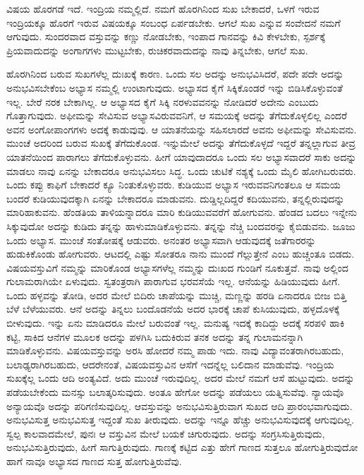 ವಿಷಯ ಹೊರಗಡೆ ಇದೆ. ಇಂದ್ರಿಯ ನಮ್ಮಲ್ಲಿದೆ. ನಮಗೆ ಹೊರಗಿನಿಂದ ಸುಖ ಬೇಕಾದರೆ, ಒಳಗೆ ಇರುವ ಇಂದ್ರಿಯಕ್ಕೂ ಹೊರಗೆ ಇರುವ ವಿಷಯಕ್ಕೂ ಸಂಬಂಧ ಏರ್ಪಡಬೇಕು. ಆಗಲೆ ಸುಖ ಎನ್ನುವ ಸಂವೇದನೆ ನಮಗೆ ಆಗುವುದು. ಸುಂದರವಾದ ವಸ್ತುವನ್ನು ಕಣ್ಣು ನೋಡಬೇಕು, ಇಂಪಾದ ಗಾನವನ್ನು ಕಿವಿ ಕೇಳಬೇಕು, ಸ್ಪರ್ಶಕ್ಕೆ ಪ್ರಿಯವಾದುದನ್ನು ಅಂಗಾಗಗಳು ಮುಟ್ಟಬೇಕು, ರುಚಿಕರವಾದುದನ್ನು ನಾವು ತಿನ್ನಬೇಕು, ಆಗಲೆ ಸುಖ.

ಹೊರಗಿನಿಂದ ಬರುವ ಸುಖಗಳೆಲ್ಲ ದುಃಖಕ್ಕೆ ಕಾರಣ. ಒಂದು ಸಲ ಅದನ್ನು ಅನುಭವಿಸಿದರೆ, ಪದೇ ಪದೇ ಅದನ್ನು ಅನುಭವಿಸಬೇಕೆಂಬ ಅಭ್ಯಾಸ ನಮ್ಮಲ್ಲಿ ಉಂಟಾಗುವುದು. ಅಭ್ಯಾಸದ ಕೈಗೆ ಸಿಕ್ಕಿಕೊಂಡರೆ ಇನ್ನು ಬಿಡಿಸಿಕೊಳ್ಳುವಂತೆ ಇಲ್ಲ. ಬೇರೆ ನರಕ ಬೇಕಾಗಿಲ್ಲ. ಆ ಅಭ್ಯಾಸದ ಕೈಗೆ ಸಿಕ್ಕಿ ನರಳುವವನನ್ನು ನೋಡಿದರೆ ಅದೇನು ಎಂಬುದು ಗೊತ್ತಾಗುವುದು. ಅಫೀಮನ್ನು ಸೇವಿಸುವ ಅಭ್ಯಾಸವಿರುವವನಿಗೆ, ಆ ಸಮಯಕ್ಕೆ ಅದನ್ನು ತೆಗೆದುಕೊಳ್ಳಲಿಲ್ಲ ಎಂದರೆ ಅವನ ಅಂಗೋಪಾಂಗಗಳು ಅದಕ್ಕೆ ಕಾಡುವುವು. ಆ ಯಾತನೆಯನ್ನು ಸಹಿಸಲಾರದೆ ಅವನು ಅಫೀಮನ್ನು ಸೇವಿಸುವನು. ಮುಂಚೆ ಅದರಿಂದ ಬರುವ ಸುಖಕ್ಕೆ ತೆಗೆದುಕೊಂಡ. ಇನ್ನುಮೇಲೆ ಅದನ್ನು ತೆಗೆದುಕೊಳ್ಳದೆ ಇದ್ದರೆ ತನ್ನಲ್ಲಾಗುವ ತೀವ್ರ ಯಾತನೆಯಿಂದ ಪಾರಾಗಲು ತೆಗೆದುಕೊಳ್ಳುವನು. ಹೀಗೆ ಯಾವುದಾದರೂ ಒಂದು ಸಲ ಅಭ್ಯಾಸವಾದರೆ ಸಾಕು ಅದನ್ನು ಮಾಡಲು ನಾವು ಏನನ್ನು ಬೇಕಾದರೂ ಅನುಭವಿಸಲು ಸಿದ್ಧ. ಒಂದು ಚುಟಿಕೆ ನಶ್ಯಕ್ಕೆ ಒಂದು ಮೈಲಿ ಹೋಗಿಬರುವರು. ಒಂದು ಕಪ್ಪು ಕಾಫಿಗೆ ಬೇಕಾದರೆ ಕ್ಯೂ ನಿಂತುಕೊಳ್ಳುವರು. ಕುಡಿಯುವ ಅಭ್ಯಾಸ ಇರುವವನಿಗಂತಲೂ ಆ ಸಮಯ ಬಂದರೆ ಕುಡಿಯುವುದಕ್ಕಾಗಿ ಏನನ್ನು ಬೇಕಾದರೂ ಮಾಡುವನು. ದುಡ್ಡಿಲ್ಲದಿದ್ದರೆ ಕದಿಯುವನು, ತನ್ನಲ್ಲಿರುವುದನ್ನು ಮಾರಿಹಾಕುವನು. ಹೆಂಡತಿಯ ತಾಳಿ\-ಯನ್ನಾ\-ದರೂ ಮಾರಿ ಕುಡಿಯುವವರೆಗೆ ಹೋಗುವನು. ಹೆಂಡದ ಬದಲು ಇನ್ನೇನು ಸಿಕ್ಕುವುದೋ ಅದನ್ನು ಕುಡಿದು ತನ್ನನ್ನು ಹಾಳುಮಾಡಿಕೊಳ್ಳುವನು. ತನ್ನನ್ನು ನೆಚ್ಚಿ ಬಂದವರನ್ನು ಕೈಬಿಡುವನು. ಜೂಜು ಒಂದು ಅಭ್ಯಾಸ. ಮುಂಚೆ ಸಂತೋಷಕ್ಕೆ ಆಡುವರು. ಅನಂತರ ಅಭ್ಯಾಸವಾಗಿ ಆಡುವುದಕ್ಕೆ ಜತೆಗಾರರನ್ನು ಹುಡುಕಿಕೊಂಡು ಹೋಗುವರು. ಆಟದಲ್ಲಿ ಎಷ್ಟು ಸೋತರೂ ನಾನು ಮುಂದೆ ಗೆಲ್ಲುತ್ತೇನೆ ಎಂಬ ಹುಚ್ಚಂತೂ ಬಿಡದು. ವಿಷಯವಸ್ತುವಿಗೆ ನಮ್ಮನ್ನು ಮಾರಿಕೊಂಡ ಅಭ್ಯಾಸಗಳೆಲ್ಲ ನಮ್ಮನ್ನು ದುಃಖದ ಗುಂಡಿಗೆ ನೂಕುತ್ತವೆ. ನಾವು ಅಲ್ಲಿಂದ ಗುಲಾಮರಾಗಿಯೇ ಏಳುವುದು. ಸ್ವತಂತ್ರರಾಗಿ ಪಾರಾಗುವ ಭರವಸೆಯೆ ಇಲ್ಲ. ಆನೆಯನ್ನು ಹಿಡಿಯುವುದು ಹೀಗೆ. ಒಂದು ಹಳ್ಳವನ್ನು ತೋಡಿ, ಅದರ ಮೇಲೆ ಬಿದಿರು ಚಾಪೆಯನ್ನು ಮುಚ್ಚಿ, ಮಣ್ಣನ್ನು ಹರಡಿ ಏನಾದರೂ ಬೀಜ ಬಿತ್ತಿ ಬೆಳೆ ಬೆಳೆಯುವರು. ಆನೆ ಅದನ್ನು ತಿನ್ನಲು ಬಂದೊಡನೆಯೆ ಅದರ ಭಾರಕ್ಕೆ ಚಾಪೆ ಕುಸಿಯುವುದು, ಹಳ್ಳದೊಳಕ್ಕೆ ಬೀಳುವುದು. ಇನ್ನು ಏನು ಮಾಡಿದರೂ ಮೇಲೆ ಬರುವಂತೆ ಇಲ್ಲ. ಮನುಷ್ಯ ಇದಕ್ಕೆ ಕಾದಿದ್ದು ಅದಕ್ಕೆ ಸರಪಳಿ ಹಾಕಿ ಕಟ್ಟಿ, ಸಾಕಿದ ಆನೆಗಳ ಮೂಲಕ ಅದನ್ನು ಪಳಗಿಸಿ ಬದುಕಿರುವ ತನಕ ಅದನ್ನು ತನ್ನ ಗುಲಾಮನನ್ನಾಗಿ ಮಾಡಿಕೊಳ್ಳುವನು. ವಿಷಯವಸ್ತುವನ್ನು ಅರಸಿ ಹೋದರೆ ನಮ್ಮ ಪಾಡು ಇದು. ನಾವು ವಿದ್ಯಾವಂತರಾಗಿರಬಹುದು, ಬಲಾಢ್ಯರಾಗಿರಬಹುದು, ಆದರೇನಂತೆ, ವಿಷಯವಸ್ತುವಿನ ಆಸೆಗೆ ಇದನ್ನೆಲ್ಲ ಬಲಿದಾನ ಮಾಡುವೆವು. ಇಂದ್ರಿಯ ಸುಖಕ್ಕೆಲ್ಲ ಒಂದು ಆದಿ ಅಂತ್ಯವಿದೆ. ಅದು ಮುಂಚೆ ಇರುವುದಿಲ್ಲ. ಅದರ ಮೇಲೆ ನಮಗೆ ಆಸೆ ಹುಟ್ಟುವುದು. ಅದನ್ನು ಪಡೆಯಬೇಕೆಂದು ಮನಸ್ಸು ಬಲಾತ್ಕರಿಸುವುದು. ಅಂತೂ ಹೇಗೋ ಅದನ್ನು ಪಡೆಯಲು ಯತ್ನಿಸುವೆವು. ನ್ಯಾಯವೊ ಅನ್ಯಾಯವೊ ಅದನ್ನು ಪರಿಗಣಿಸುವುದಿಲ್ಲ. ಆ\break ವಸ್ತುವನ್ನು ಅನುಭವಿಸುತ್ತಿರುವಾಗ ಸುಖದ ಆದಿ ಪ್ರಾರಂಭವಾಗುವುದು. ಅನುಭವಿಸುತ್ತ ಅನುಭವಿಸುತ್ತ ಇದ್ದಂತೆ ಸುಖ ತೀರುವುದು. ಅದನ್ನು ಇನ್ನೂ ಹೆಚ್ಚು ಅನುಭವಿಸುವುದಕ್ಕೆ ಆಗುವುದಿಲ್ಲ. ಸ್ವಲ್ಪ ಕಾಲವಾದಮೇಲೆ, ಪುನಃ ಆ ವಸ್ತುವಿನ ಮೇಲೆ ಬಯಕೆ ಚಿಗುರುವುದು. ಅದನ್ನು ಸಂಗ್ರಸಿಸುತ್ತಿರುವುದು, ಅನುಭವಿಸುತ್ತಿರುವುದು, ಹೀಗೆ ಸಾಗುತ್ತಿರುವುದು. ಗಾಣಕ್ಕೆ ಕಟ್ಟಿದ ಎತ್ತು ಹೇಗೆ ಗಾಣದ ಸುತ್ತಲೂ ಹೋಗುತ್ತಿರುವುದೋ ಹಾಗೆ ನಾವೂ ಅಭ್ಯಾಸದ ಗಾಣದ ಸುತ್ತ ಹೋಗುತ್ತಿರುವೆವು.

